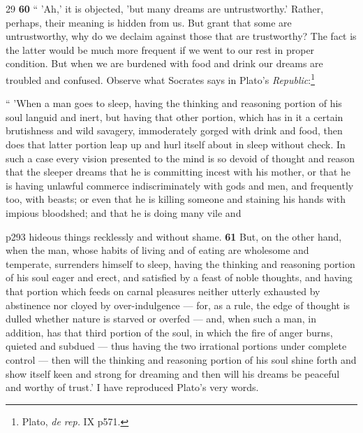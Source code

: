 29
\textbf{60} `` 'Ah,' it is objected, 'but many dreams are untrustworthy.' Rather, perhaps, their meaning is hidden from us. But grant that some are untrustworthy, why do we declaim against those that are trustworthy? The fact is the latter would be much more frequent if we went to our rest in proper condition. But when we are burdened with food and drink our dreams are troubled and confused. Observe what Socrates says in Plato's \emph{Republic}:\footnote{Plato, \emph{de rep.} IX p571.

}

`` 'When a man goes to sleep, having the thinking and reasoning portion of his soul languid and inert, but having that other portion, which has in it a certain brutishness and wild savagery, immoderately gorged with drink and food, then does that latter portion leap up and hurl itself about in sleep without check. In such a case every vision presented to the mind is so devoid of thought and reason that the sleeper dreams that he is committing incest with his mother, or that he is having unlawful commerce indiscriminately with gods and men, and frequently too, with beasts; or even that he is killing someone and staining his hands with impious bloodshed; and that he is doing many vile and

p293 hideous things recklessly and without shame. \textbf{61} But, on the other hand, when the man, whose habits of living and of eating are wholesome and temperate, surrenders himself to sleep, having the thinking and reasoning portion of his soul eager and erect, and satisfied by a feast of noble thoughts, and having that portion which feeds on carnal pleasures neither utterly exhausted by abstinence nor cloyed by over-indulgence \texthebrew{—} for, as a rule, the edge of thought is dulled whether nature is starved or overfed \texthebrew{—} and, when such a man, in addition, has that third portion of the soul, in which the fire of anger burns, quieted and subdued \texthebrew{—} thus having the two irrational portions under complete control \texthebrew{—} then will the thinking and reasoning portion of his soul shine forth and show itself keen and strong for dreaming and then will his dreams be peaceful and worthy of trust.' I have reproduced Plato's very words.

